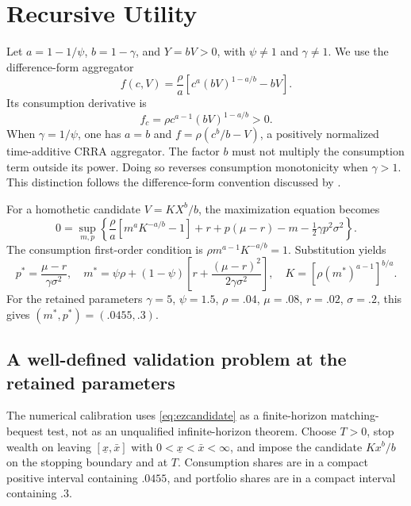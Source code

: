 \documentclass[ecta,draft]{econsocart}
\theoremstyle{definition}
\theoremstyle{remark}
\begin{document}
\section{Recursive Utility}\label{sec:recursive}
Let $a=1-1/\psi$, $b=1-\gamma$, and $Y=bV>0$, with $\psi\ne1$ and $\gamma\ne1$. We use the difference-form aggregator
\begin{equation}\label{eq:ez}
 f(c,V)=\frac\rho a\left[c^a(bV)^{1-a/b}-bV\right].
\end{equation}
Its consumption derivative is
\begin{equation}\label{eq:ezderivative}
 f_c=\rho c^{a-1}(bV)^{1-a/b}>0.
\end{equation}
When $\gamma=1/\psi$, one has $a=b$ and $f=\rho(c^b/b-V)$, a positively normalized time-additive CRRA aggregator. The factor $b$ must not multiply the consumption term outside its power. Doing so reverses consumption monotonicity when $\gamma>1$. This distinction follows the difference-form convention discussed by \citet{herdegen2021}.

For a homothetic candidate $V=KX^b/b$, the maximization equation becomes
\begin{equation}\label{eq:eznormalized}
 0=\sup_{m,p}\left\{\frac\rho a[m^aK^{-a/b}-1]
       +r+p(\mu-r)-m-\tfrac12\gamma p^2\sigma^2\right\}.
\end{equation}
The consumption first-order condition is $\rho m^{a-1}K^{-a/b}=1$. Substitution yields
\begin{equation}\label{eq:ezcandidate}
 p^*=\frac{\mu-r}{\gamma\sigma^2},\quad
 m^*=\psi\rho+(1-\psi)\left[r+\frac{(\mu-r)^2}{2\gamma\sigma^2}\right],\quad
 K=[\rho(m^*)^{a-1}]^{b/a}.
\end{equation}
For the retained parameters $\gamma=5$, $\psi=1.5$, $\rho=.04$, $\mu=.08$, $r=.02$, $\sigma=.2$, this gives $(m^*,p^*)=(.0455,.3)$.

\subsection{A well-defined validation problem at the retained parameters}
The numerical calibration uses \eqref{eq:ezcandidate} as a finite-horizon matching-bequest test, not as an unqualified infinite-horizon theorem. Choose $T>0$, stop wealth on leaving $[\underline x,\bar x]$ with $0<\underline x<\bar x<\infty$, and impose the candidate $Kx^b/b$ on the stopping boundary and at $T$. Consumption shares are in a compact positive interval containing $.0455$, and portfolio shares are in a compact interval containing $.3$.
\end{document}
